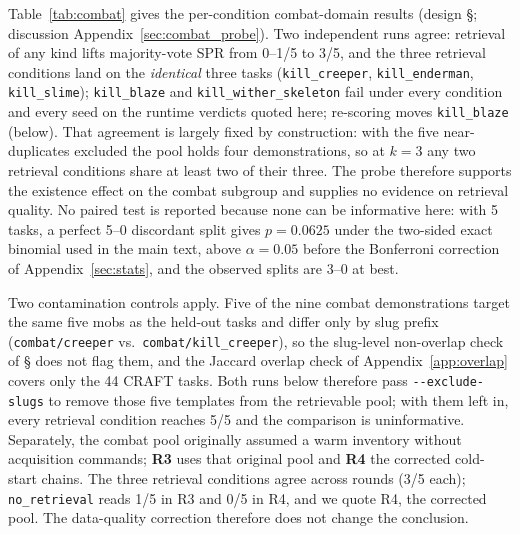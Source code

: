 \documentclass[letterpaper]{article} %
\newcommand{\appref}[1]{Appendix~\ref{#1}}
\newcommand{\bodyref}[1]{\getrefnumber{#1}}
\begin{document}
Table~\ref{tab:combat} gives the per-condition combat-domain results
(design \S\bodyref{sec:combat_design}; discussion \appref{sec:combat_probe}).  Two independent runs agree: retrieval
of any kind lifts majority-vote SPR from 0--1/5 to 3/5, and the
three retrieval conditions land on the \emph{identical} three tasks
(\texttt{kill\_creeper}, \texttt{kill\_enderman}, \texttt{kill\_slime});
\texttt{kill\_blaze} and \texttt{kill\_wither\_skeleton} fail under every
condition and every seed on the runtime verdicts quoted here; re-scoring moves
\texttt{kill\_blaze} (below).  That agreement is largely fixed by
construction: with the five near-duplicates excluded the pool holds four
demonstrations, so at $k{=}3$ any two retrieval conditions share at least two of their
three.  The probe therefore supports the
existence effect on the combat subgroup and supplies no evidence on retrieval
quality.  No paired test is reported because none can be informative
here: with 5 tasks, a perfect 5--0 discordant split gives $p{=}0.0625$
under the two-sided exact binomial used in the main text, above
$\alpha{=}0.05$ before the Bonferroni correction of \appref{sec:stats}, and the
observed splits are 3--0 at best.

Two contamination controls apply.  Five of the nine combat
demonstrations target the same five mobs as the held-out tasks and
differ only by slug prefix (\texttt{combat/creeper} vs.\
\texttt{combat/kill\_creeper}), so the slug-level non-overlap check of
\S\bodyref{sec:tasks} does not flag them, and the Jaccard overlap check of \appref{app:overlap} covers only the 44 CRAFT
tasks.  Both runs below therefore
pass \texttt{-{}-exclude-slugs} to remove those five templates from the
retrievable pool; with them left in, every retrieval condition reaches
5/5 and the comparison is uninformative.  Separately, the combat pool
originally assumed a warm inventory without acquisition commands;
\textbf{R3} uses that original pool and \textbf{R4} the corrected
cold-start chains.  The three retrieval conditions agree across rounds
(3/5 each); \texttt{no\_retrieval} reads 1/5 in R3 and 0/5 in R4, and we
quote R4, the corrected pool.  The data-quality correction therefore does
not change the conclusion.
\end{document}
